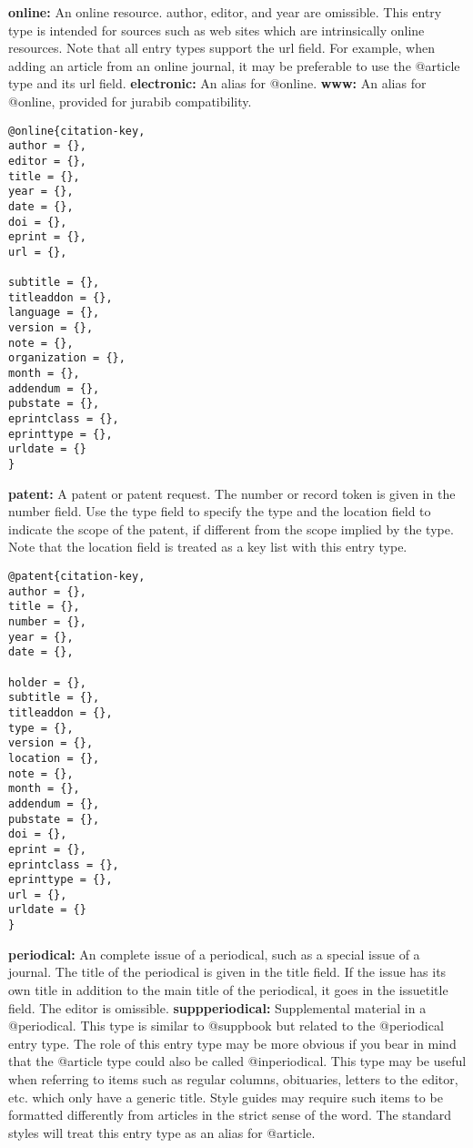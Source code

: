 \documentclass{article}
\begin{document}
\begin{multicols}{2}
\vspace{0.5cm}
\noindent \textbf{online:} An online resource. author, editor, and year are omissible. This entry type is intended for sources such as web sites which are intrinsically online resources. Note that all entry types support the url field. For example, when adding an article from an online journal, it may be preferable to use the @article type and its url field. \textbf{electronic:}  An alias for @online. \textbf{www:}  An alias for @online, provided for jurabib compatibility. 
\begin{verbatim}
@online{citation-key,
author = {},
editor = {},
title = {},
year = {},
date = {},
doi = {},
eprint = {},
url = {},

subtitle = {},
titleaddon = {},
language = {},
version = {},
note = {},
organization = {},
month = {},
addendum = {},
pubstate = {},
eprintclass = {},
eprinttype = {},
urldate = {}
}
\end{verbatim}

\vspace{0.5cm}
\noindent \textbf{patent:} A patent or patent request. The number or record token is given in the number field. Use the type field to specify the type and the location field to indicate the scope of the patent, if different from the scope implied by the type. Note that the location field is treated as a key list with this entry type.
\begin{verbatim}
@patent{citation-key,
author = {},
title = {},
number = {},
year = {},
date = {},

holder = {},
subtitle = {},
titleaddon = {},
type = {},
version = {},
location = {},
note = {},
month = {},
addendum = {},
pubstate = {},
doi = {},
eprint = {},
eprintclass = {},
eprinttype = {},
url = {},
urldate = {}
}
\end{verbatim}

\vspace{0.5cm}
\noindent \textbf{periodical:} An complete issue of a periodical, such as a special issue of a journal. The title of the periodical is given in the title field. If the issue has its own title in addition to the main title of the periodical, it goes in the issuetitle field. The editor is omissible. \textbf{suppperiodical:} Supplemental material in a @periodical. This type is similar to @suppbook but related to the @periodical entry type. The role of this entry type may be more obvious if you bear in mind that the @article type could also be called @inperiodical. This type may be useful when referring to items such as regular columns, obituaries, letters to the editor, etc. which only have a generic title. Style guides may require such items to be formatted differently from articles in the strict sense of the word. The standard styles will treat this entry type as an alias for @article. 


\end{multicols}
\end{document}
